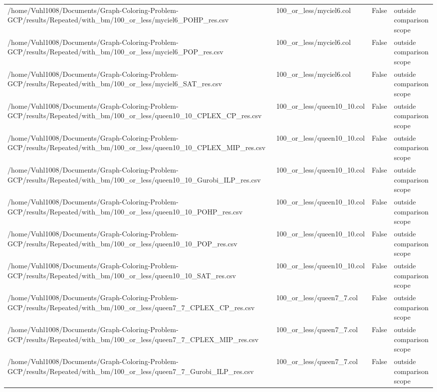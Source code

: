 \begin{table}[htbp]
\begin{tabular}{llll}
/home/Vuhl1008/Documents/Graph-Coloring-Problem-GCP/results/Repeated/with\_bm/100\_or\_less/myciel6\_POHP\_res.csv & 100\_or\_less/myciel6.col & False & outside comparison scope \\
/home/Vuhl1008/Documents/Graph-Coloring-Problem-GCP/results/Repeated/with\_bm/100\_or\_less/myciel6\_POP\_res.csv & 100\_or\_less/myciel6.col & False & outside comparison scope \\
/home/Vuhl1008/Documents/Graph-Coloring-Problem-GCP/results/Repeated/with\_bm/100\_or\_less/myciel6\_SAT\_res.csv & 100\_or\_less/myciel6.col & False & outside comparison scope \\
/home/Vuhl1008/Documents/Graph-Coloring-Problem-GCP/results/Repeated/with\_bm/100\_or\_less/queen10\_10\_CPLEX\_CP\_res.csv & 100\_or\_less/queen10\_10.col & False & outside comparison scope \\
/home/Vuhl1008/Documents/Graph-Coloring-Problem-GCP/results/Repeated/with\_bm/100\_or\_less/queen10\_10\_CPLEX\_MIP\_res.csv & 100\_or\_less/queen10\_10.col & False & outside comparison scope \\
/home/Vuhl1008/Documents/Graph-Coloring-Problem-GCP/results/Repeated/with\_bm/100\_or\_less/queen10\_10\_Gurobi\_ILP\_res.csv & 100\_or\_less/queen10\_10.col & False & outside comparison scope \\
/home/Vuhl1008/Documents/Graph-Coloring-Problem-GCP/results/Repeated/with\_bm/100\_or\_less/queen10\_10\_POHP\_res.csv & 100\_or\_less/queen10\_10.col & False & outside comparison scope \\
/home/Vuhl1008/Documents/Graph-Coloring-Problem-GCP/results/Repeated/with\_bm/100\_or\_less/queen10\_10\_POP\_res.csv & 100\_or\_less/queen10\_10.col & False & outside comparison scope \\
/home/Vuhl1008/Documents/Graph-Coloring-Problem-GCP/results/Repeated/with\_bm/100\_or\_less/queen10\_10\_SAT\_res.csv & 100\_or\_less/queen10\_10.col & False & outside comparison scope \\
/home/Vuhl1008/Documents/Graph-Coloring-Problem-GCP/results/Repeated/with\_bm/100\_or\_less/queen7\_7\_CPLEX\_CP\_res.csv & 100\_or\_less/queen7\_7.col & False & outside comparison scope \\
/home/Vuhl1008/Documents/Graph-Coloring-Problem-GCP/results/Repeated/with\_bm/100\_or\_less/queen7\_7\_CPLEX\_MIP\_res.csv & 100\_or\_less/queen7\_7.col & False & outside comparison scope \\
/home/Vuhl1008/Documents/Graph-Coloring-Problem-GCP/results/Repeated/with\_bm/100\_or\_less/queen7\_7\_Gurobi\_ILP\_res.csv & 100\_or\_less/queen7\_7.col & False & outside comparison scope \\

\end{tabular}
\end{table}
